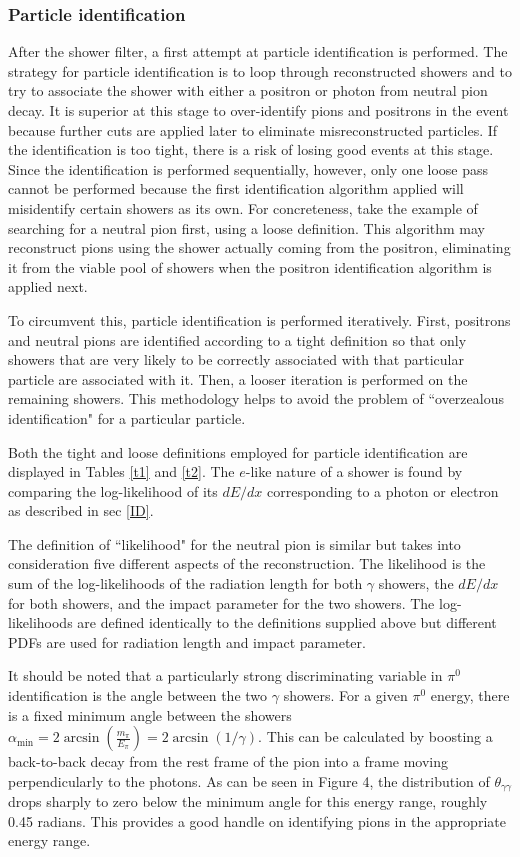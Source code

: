 \documentclass[a4paper, 10pt]{article}
\begin{document}
\subsubsection{Particle identification}

After the shower filter, a first attempt at particle identification is performed. The strategy for particle identification is to loop through reconstructed showers and to try to associate the shower with either a positron or photon from neutral pion decay. It is superior at this stage to over-identify pions and positrons in the event because further cuts are applied later to eliminate misreconstructed particles. If the identification is too tight, there is a risk of losing good events at this stage. Since the identification is performed sequentially, however, only one loose pass cannot be performed because the first identification algorithm applied will misidentify certain showers as its own. For concreteness, take the example of searching for a neutral pion  first, using a loose definition. This algorithm may reconstruct pions using the shower actually coming from the positron, eliminating it from the viable pool of showers when the positron identification algorithm is applied next.

To circumvent this, particle identification is performed iteratively. First, positrons and neutral pions are identified according to a tight definition so that only showers that are very likely to be correctly associated with that particular particle are associated with it. Then, a looser iteration is performed on the remaining showers. This methodology helps to avoid the problem of ``overzealous identification" for a particular particle.

Both the tight and loose definitions employed for particle identification are displayed in Tables \ref{t1} and \ref{t2}. The $e$-like nature of a shower is found by comparing the log-likelihood of its $dE/dx$ corresponding to a photon or electron as described in sec \ref{ID}. 

The definition of ``likelihood" for the neutral pion is similar but takes into consideration five different aspects of the reconstruction. The likelihood is the sum of the log-likelihoods of the radiation length for both $\gamma$ showers, the $dE/dx$ for both showers, and the impact parameter for the two showers. The log-likelihoods are defined identically to the definitions supplied above but different PDFs are used for radiation length and impact parameter.

It should be noted that a particularly strong discriminating variable in $\pi^{0}$ identification is the angle between the two $\gamma$ showers. For a given $\pi^{0}$ energy, there is a fixed minimum angle between the showers $\alpha_{\text{min}} = 2\arcsin(\frac{m_{\pi}}{E_{\pi}}) = 2\arcsin(1/\gamma)$. This can be calculated by boosting a back-to-back decay from the rest frame of the pion into a frame moving perpendicularly to the photons. As can be seen in Figure 4, the distribution of $\theta_{\gamma\gamma}$ drops sharply to zero below the minimum angle for this energy range, roughly 0.45 radians. This provides a good handle on identifying pions in the appropriate energy range.
\end{document}
